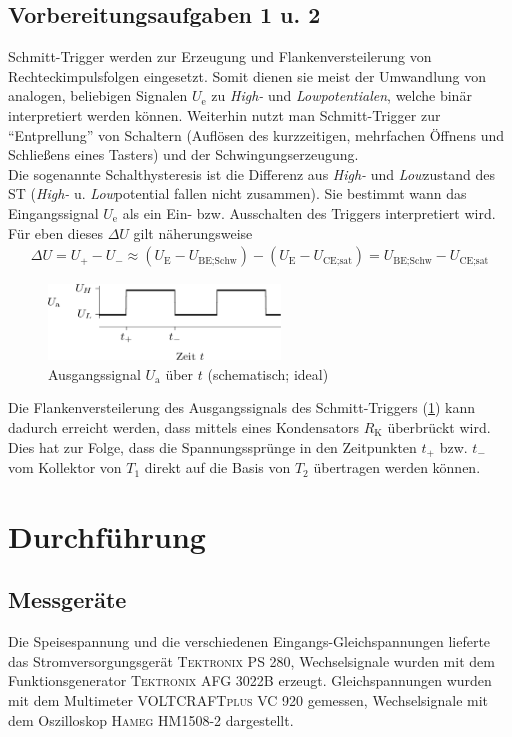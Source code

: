 \documentclass[numbers=noenddot,12pt,a4paper]{scrartcl}
\newcommand{\ix}[1]{_\text{#1}}
\begin{document}
\subsection{Vorbereitungsaufgaben 1 u. 2}
Schmitt-Trigger werden zur Erzeugung und Flankenversteilerung von Rechteckimpulsfolgen eingesetzt. Somit dienen sie meist der Umwandlung von analogen, beliebigen Signalen $U\ix{e}$ zu \textit{High-} und \textit{Lowpotentialen}, welche binär interpretiert werden können. Weiterhin nutzt man Schmitt-Trigger zur "`Entprellung"' von Schaltern (Auflösen des kurzzeitigen, mehrfachen Öffnens und Schließens eines Tasters) und der Schwingungserzeugung. \\
Die sogenannte Schalthysteresis ist die Differenz aus \textit{High-} und \textit{Low}zustand des ST (\textit{High-} u. \textit{Low}potential fallen nicht zusammen). Sie bestimmt wann das Eingangssignal $U\ix{e}$ als ein Ein- bzw. Ausschalten des Triggers interpretiert wird. Für eben dieses $\Delta U$ gilt näherungsweise
\begin{align}
\Delta U=U_+-U_-\approx\left(U\ix{E}-U\ix{BE;Schw}\right)-\left(U\ix{E}-U\ix{CE;sat}\right)=U\ix{BE;Schw}-U\ix{CE;sat}
\end{align}
\begin{figure}[H]
\centering
\includegraphics[width=0.55\textwidth]{ausgangssignal.png}
\caption{Ausgangssignal $U\ix{a}$ über $t$ (schematisch; ideal)}
\label{img:signal}
\end{figure}
Die Flankenversteilerung des Ausgangssignals des Schmitt-Triggers (\ref{img:signal}) kann dadurch erreicht werden, dass mittels eines Kondensators $R\ix{K}$ überbrückt wird. Dies hat zur Folge, dass die Spannungssprünge in den Zeitpunkten $t_+$ bzw. $t_-$ vom Kollektor von $T_1$ direkt auf die Basis von $T_2$ übertragen werden können.
\section{Durchführung}
\subsection{Messgeräte}
Die Speisespannung und die verschiedenen Eingangs-Gleichspannungen lieferte das Stromversorgungsgerät \textsc{Tektronix PS 280}, Wechselsignale wurden mit dem Funktionsgenerator \textsc{Tektronix AFG 3022B} erzeugt. Gleichspannungen wurden mit dem Multimeter \textsc{VOLTCRAFTplus VC 920} gemessen, Wechselsignale mit dem Oszilloskop \textsc{Hameg HM1508-2} dargestellt.
\end{document}
